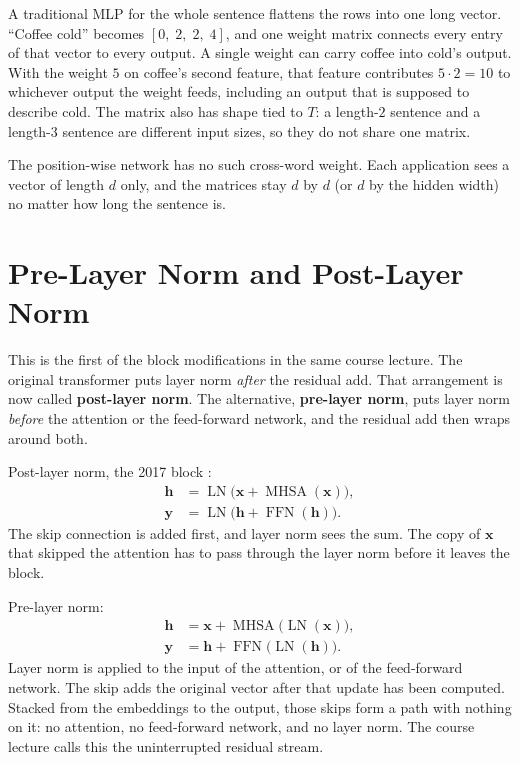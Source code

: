 \documentclass[11pt]{article}
\begin{document}
A traditional MLP for the whole sentence flattens the rows into one long
vector. ``Coffee cold'' becomes \([0,\; 2,\; 2,\; 4]\), and one weight
matrix connects every entry of that vector to every output. A single weight
can carry coffee into cold's output. With the weight \(5\) on coffee's
second feature, that feature contributes \(5\cdot 2 = 10\) to whichever
output the weight feeds, including an output that is supposed to describe
cold. The matrix also has shape tied to \(T\): a length-\(2\) sentence and
a length-\(3\) sentence are different input sizes, so they do not share one
matrix.

The position-wise network has no such cross-word weight. Each application
sees a vector of length \(d\) only, and the matrices stay \(d\) by \(d\)
(or \(d\) by the hidden width) no matter how long the sentence is.

\section{Pre-Layer Norm and Post-Layer Norm}
\label{sec:pre-post}

This is the first of the block modifications in the same course lecture.
The original transformer puts layer norm \emph{after} the residual add.
That arrangement is now called \textbf{post-layer norm}. The alternative,
\textbf{pre-layer norm}, puts layer norm \emph{before} the attention or the
feed-forward network, and the residual add then wraps around both.

Post-layer norm, the 2017 block \cite{vaswani2017attention}:
\begin{align*}
  \mathbf{h}
  &=
  \operatorname{LN}\bigl(\mathbf{x} + \operatorname{MHSA}(\mathbf{x})\bigr),
  \\
  \mathbf{y}
  &=
  \operatorname{LN}\bigl(\mathbf{h} + \operatorname{FFN}(\mathbf{h})\bigr).
\end{align*}
The skip connection is added first, and layer norm sees the sum. The copy
of \(\mathbf{x}\) that skipped the attention has to pass through the layer
norm before it leaves the block.

Pre-layer norm:
\begin{align*}
  \mathbf{h}
  &=
  \mathbf{x} + \operatorname{MHSA}\bigl(\operatorname{LN}(\mathbf{x})\bigr),
  \\
  \mathbf{y}
  &=
  \mathbf{h} + \operatorname{FFN}\bigl(\operatorname{LN}(\mathbf{h})\bigr).
\end{align*}
Layer norm is applied to the input of the attention, or of the feed-forward
network. The skip adds the original vector after that update has been
computed. Stacked from the embeddings to the output, those skips form a
path with nothing on it: no attention, no feed-forward network, and no
layer norm. The course lecture calls this the uninterrupted residual
stream.
\end{document}
